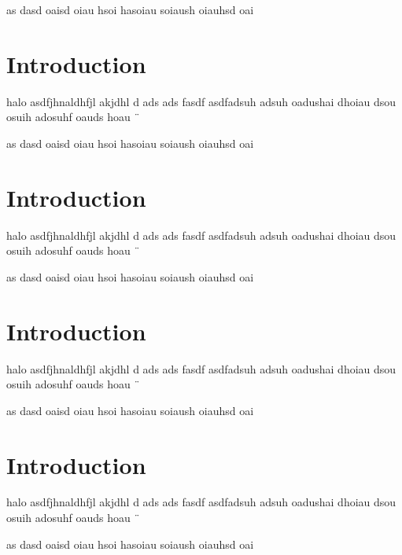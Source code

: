 \documentclass[twocolumn]{article}
\begin{document}
as dasd oaisd oiau hsoi hasoiau soiaush oiauhsd oai 
\section{Introduction}
halo
asdfjhnaldhfjl akjdhl d
 ads ads fasdf asdfadsuh adsuh oadushai dhoiau dsou  osuih adosuhf oauds hoau ¨

as dasd oaisd oiau hsoi hasoiau soiaush oiauhsd oai 
\section{Introduction}
halo
asdfjhnaldhfjl akjdhl d
 ads ads fasdf asdfadsuh adsuh oadushai dhoiau dsou  osuih adosuhf oauds hoau ¨

as dasd oaisd oiau hsoi hasoiau soiaush oiauhsd oai 
\section{Introduction}
halo
asdfjhnaldhfjl akjdhl d
 ads ads fasdf asdfadsuh adsuh oadushai dhoiau dsou  osuih adosuhf oauds hoau ¨

as dasd oaisd oiau hsoi hasoiau soiaush oiauhsd oai 
\section{Introduction}
halo
asdfjhnaldhfjl akjdhl d
 ads ads fasdf asdfadsuh adsuh oadushai dhoiau dsou  osuih adosuhf oauds hoau ¨

as dasd oaisd oiau hsoi hasoiau soiaush oiauhsd oai 
\end{document}
